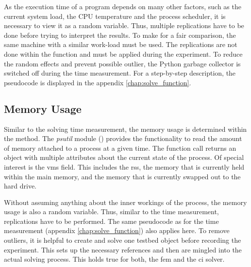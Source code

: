 \documentclass[./\jobname.tex]{subfiles}
\begin{document}
As the execution time of a program depends on many other factors, such as the current system load, the CPU temperature and the process scheduler, it is necessary to view it as a random variable. Thus, multiple replications have to be done before trying to interpret the results. To make for a fair comparison, the same machine with a similar work-load must be used.  The replications are not done within the  function and must be applied during the experiment. To reduce the random effects and prevent possible outlier, the Python garbage collector is switched off during the time measurement. For a step-by-step description, the pseudocode is displayed in the appendix \ref{chap:solve_function}. 



\subsection{Memory Usage}
\label{chap:metric_mem}
Similar to the solving time measurement, the memory usage is determined within the  method. The \textit{psutil} module (\cite{rodola_psutil_2020}) provides the functionality to read the amount of memory attached to a process at a given time. The function call  returns an object with multiple attributes about the current state of the process. Of special interest is the \gls{vms} field. This includes the \gls{rss}, the memory that is currently held within the main memory, and the memory that is currently swapped out to the hard drive.

Without assuming anything about the inner workings of the process, the memory usage is also a random variable. Thus, similar to the time measurement, replications have to be performed. The same pseudocode as for the time measurement (appendix \ref{chap:solve_function}) also applies here. To remove outliers, it is helpful to create and solve one testbed object before recording the experiment. This sets up the necessary references and then are mingled into the actual solving process. This holds true for both, the \gls{fem} and the \gls{ci} solver.  
\end{document}
